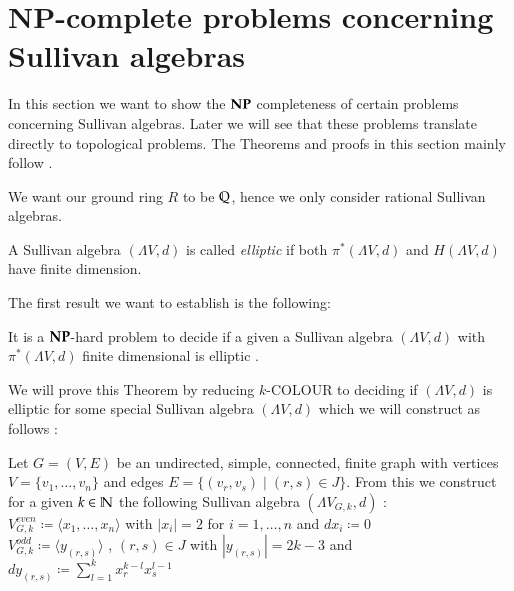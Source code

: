  \section{NP-complete problems concerning Sullivan algebras}
 
 In this section we want to show the 
 $\mathbf{NP}$ completeness of certain problems concerning Sullivan algebras. Later we will see that these problems
 translate directly to topological problems. The Theorems and proofs in this section mainly follow  \cite{Lechuga2000}.
 
 We want our ground ring $R$ to be  $\mathbb{Q}$, hence we only consider rational Sullivan algebras.
 
 \begin{Definition}
  A Sullivan algebra $(\Lambda V, d)$ is called \emph{elliptic} if both $\pi^*(\Lambda V,d)$ and $H(\Lambda V,d)$ have
  finite dimension.
 \end{Definition}
 
 The first result we want to establish is the following:
 
 \begin{Theorem}
 \label{cohomologyFinTheorem}
  It is a $\mathbf{NP}$-hard problem to decide if a given a Sullivan algebra $(\Lambda V,d)$ with $\pi^*(\Lambda V,d)$ finite dimensional 
  is elliptic . 
 \end{Theorem}
 
 
 We will prove this Theorem by reducing $k$-COLOUR to deciding if $(\Lambda V,d)$ is elliptic for some special 
 Sullivan algebra $(\Lambda V,d)$ which we will construct as follows : \\
 
 \begin{Construction}
 \label{constructionOfSullivanAlgebra}
 Let $G = (V,E)$ be an undirected, simple, connected, finite graph with vertices $ V = \lbrace v_1, \dotsc , v_n \rbrace $
 and edges $ E = \lbrace (v_r, v_s) \; | \; (r,s) \in J \rbrace$. From this we construct for a given $k \in \mathbb{N}$ the following
 Sullivan algebra $(\Lambda V_{G,k} , d)$ : \\
 
 $ V^{even}_{G,k} \coloneqq \langle x_1, \dotsc , x_n \rangle $ \; with \; $|x_i| = 2$ \; for \; $ i = 1, \dotsc , n$ \; 
 and \; $dx_i \coloneqq 0$ \\
 
 $V^{odd}_{G,k} \coloneqq \langle y_{(r,s)} \rangle$ , $(r,s) \in J$ \; with \; $|y_{(r,s)}| = 2k - 3$ \; and \; $dy_{(r,s)} \coloneqq 
 \sum_{l = 1}^k x_r^{k -l} x_s^{l - 1}$ \\
 
 \end{Construction}

